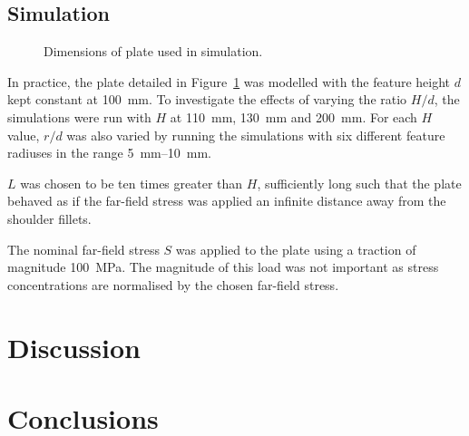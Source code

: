 \documentclass[a4paper,11pt,twocolumn]{article}
\newcommand{\MPa}{\si{\mega\pascal}\xspace}
\newcommand{\mm}{\si{\milli\meter}\xspace}
\begin{document}
\subsection{Simulation}

\begin{figure}[h]
    \def\svgwidth{0.48\textwidth}
    
    \caption{Dimensions of plate used in simulation.}
    \label{fig:simulation_dims}
\end{figure}

In practice, the plate detailed in Figure~\ref{fig:simulation_dims} was modelled
with the feature height $d$ kept constant at 100~\mm. To investigate the effects
of varying the ratio $H/d$, the simulations were run with $H$ at 110~\mm,
130~\mm and 200~\mm. For each $H$ value, $r/d$ was also varied by running the
simulations with six different feature radiuses in the range 5~\mm--10~\mm.

$L$ was chosen to be ten times greater than $H$, sufficiently long such that the
plate behaved as if the far-field stress was applied an infinite distance away
from the shoulder fillets.

The nominal far-field stress $S$ was applied to the plate using a traction of
magnitude 100~\MPa. The magnitude of this load was not important as stress
concentrations are normalised by the chosen far-field stress.

\section{Discussion}
\section{Conclusions}

\printbibliography
\end{document}
